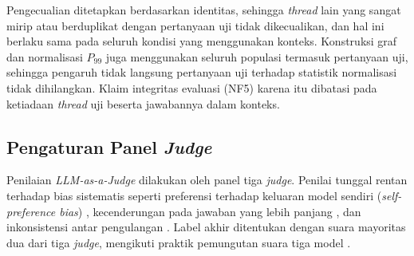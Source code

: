 Pengecualian ditetapkan berdasarkan identitas, sehingga \emph{thread} lain yang sangat mirip atau berduplikat dengan pertanyaan uji tidak dikecualikan, dan hal ini berlaku sama pada seluruh kondisi yang menggunakan konteks. Konstruksi graf dan normalisasi $P_{99}$ juga menggunakan seluruh populasi termasuk pertanyaan uji, sehingga pengaruh tidak langsung pertanyaan uji terhadap statistik normalisasi tidak dihilangkan. Klaim integritas evaluasi (NF5) karena itu dibatasi pada ketiadaan \emph{thread} uji beserta jawabannya dalam konteks.

\subsection{Pengaturan Panel \emph{Judge}}
\label{subsec:panel-judge}

Penilaian \emph{LLM-as-a-Judge} dilakukan oleh panel tiga \emph{judge}. Penilai tunggal rentan terhadap bias sistematis seperti preferensi terhadap keluaran model sendiri (\emph{self-preference bias}) \autocite{Panickssery2024,Zheng2023}, kecenderungan pada jawaban yang lebih panjang \autocite{Zheng2023}, dan inkonsistensi antar pengulangan \autocite{Gu2026}. Label akhir ditentukan dengan suara mayoritas dua dari tiga \emph{judge}, mengikuti praktik pemungutan suara tiga model \autocite{Filho2026}.

